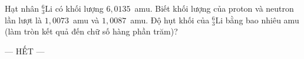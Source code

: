 	\begin{ex}%
		Hạt nhân ${}^6_3\text{Li}$ có khối lượng $6{,}0135$~amu. Biết khối lượng của proton và neutron lần lượt là $1{,}0073$~amu và $1{,}0087$~amu. Độ hụt khối của ${}^6_3\text{Li}$ bằng bao nhiêu amu (làm tròn kết quả đến chữ số hàng phần trăm)?
		\par
	\end{ex}

	\centerline{--- HẾT ---}


